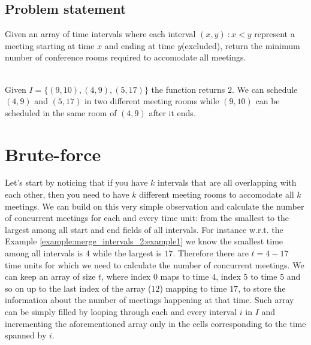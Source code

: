 \subsection{Problem statement}
\begin{exercise}
	\label{example:merge_intervals_2:exercice1_2}
	Given an array of time intervals where each interval $(x,y) \: : x < y$ represent a meeting starting at time $x$ and ending at time $y$(excluded), return the minimum number of conference rooms required to accomodate all meetings.
	
		\begin{example}
			\label{example:merge_intervals_2:example1}
			\hfill \\
			Given $I=\{(9,10),(4,9),(5,17)\}$ the function returns $2$. We can schedule $(4,9)$ and $(5,17)$ in two different meeting rooms while $(9,10)$ can be scheduled in the same room of $(4,9)$ after it ends. 
		\end{example}
	
	\end{exercise}
	

\section{Brute-force}
Let's start by noticing that if you have $k$ intervals that are all overlapping with each other, then you need to have $k$ different meeting rooms to accomodate all $k$ meetings.
We can build on this very simple observation and calculate the number of concurrent meetings for each and every time unit: from the smallest to the largest among all start and end fields of all intervals.
For instance w.r.t. the Example \ref{example:merge_intervals_2:example1} we know the smallest time among all intervals is $4$ while the largest is $17$. Therefore there are $t=4-17$ time units for which we need to calculate the number of concurrent meetings. 
We can keep an array of size $t$, where index $0$ maps to time $4$, index $5$ to time $5$ and so on up to the last index of the array ($12$) mapping to time $17$,
to store the information about the number of meetings happening at that time. Such array can be simply filled by looping through each and every interval $i$ in $I$ and incrementing the aforementioned array only in the cells corresponding to the time spanned by $i$. 

